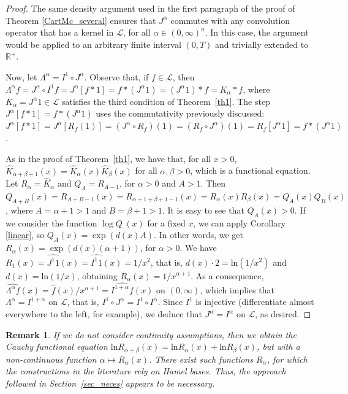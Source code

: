 \documentclass[12pt,reqno]{amsart}
\theoremstyle{plain}
\newtheorem{remark}[theorem]{Remark}
\numberwithin{equation}{section} %
\begin{document}
\begin{proof}
The same density argument used in the first paragraph of the proof of Theorem \ref{CartMc_several} ensures that $J^\alpha$ commutes with any convolution operator that has a kernel in $\mathcal{L}$, for all $\alpha\in (0,\infty)^n$. In this case, the argument would be applied to an arbitrary finite interval $(0,T)$ and trivially extended to $\mathbb{R}^+$.

Now, let $\Lambda^\alpha =I^1\circ J^\alpha$. Observe that, if $f\in\mathcal{L}$, then $\Lambda^\alpha f=J^\alpha\circ I^1 f=J^\alpha[f\ast 1]=f\ast (J^\alpha 1)=(J^\alpha 1)\ast f=K_\alpha\ast f$, where $K_\alpha=J^\alpha 1\in\mathcal{L}$ satisfies the third condition of Theorem~\ref{th1}. The step $J^\alpha[f\ast 1]=f\ast (J^\alpha 1)$ uses the commutativity previously discussed: $J^\alpha[f\ast 1]=J^\alpha[R_f(1)]=(J^\alpha\circ R_f)(1)=(R_f\circ J^\alpha)(1)=R_f[J^\alpha 1]=f\ast (J^\alpha 1)$.

As in the proof of Theorem~\ref{th1}, we have that, for all $x>0$, $\widehat{K}_{\alpha+\beta+1}(x)=\widehat{K}_\alpha(x)\widehat{K}_\beta(x)$ for all $\alpha,\beta>0$, which is a functional equation. Let $R_\alpha=\widehat{K}_\alpha$ and $Q_A=R_{A-1}$, for $\alpha>0$ and $A>1$. Then $Q_{A+B}(x)=R_{A+B-1}(x)=R_{\alpha+1+\beta+1-1}(x)=R_\alpha(x) R_\beta(x)=Q_A(x) Q_B(x)$, where $A=\alpha+1>1$ and $B=\beta+1>1$. It is easy to see that $Q_A(x)>0$. If we consider the function $\log Q_{\cdot}(x)$ for a fixed $x$, we can apply Corollary \ref{linear}, so $Q_A(x)=\exp(d(x)A)$. In other words, we get $R_\alpha(x)=\exp(d(x)(\alpha+1))$, for $\alpha>0$. We have $R_1(x)=\widehat{J^1 1}(x)=\widehat{I^1 1}(x)=1/x^2$, that is, $d(x)\cdot 2=\mathrm{ln}(1/x^2)$ and $d(x)=\mathrm{ln}(1/x)$, obtaining $R_\alpha(x)=1/x^{\alpha+1}$. As a consequence, $\widehat{\Lambda^\alpha f}(x)=\widehat{f}(x)/x^{\alpha+1}=\widehat{I^{1+\alpha} f}(x)$ on $(0,\infty)$, which implies that $\Lambda^\alpha=I^{1+\alpha}$ on $\mathcal{L}$, that is, $I^1 \circ J^\alpha=I^1\circ I^\alpha$. Since $I^1$ is injective (differentiate almost everywhere to the left, for example), we deduce that $J^\alpha=I^\alpha$ on $\mathcal{L}$, as desired.
\end{proof}

\begin{remark} \normalfont
If we do not consider continuity assumptions, then we obtain the Cauchy functional equation $\mathrm{ln}R_{\alpha+\beta}(x)=\mathrm{ln}R_\alpha(x)+\mathrm{ln}R_\beta(x)$, but with a non-continuous function $\alpha\mapsto R_\alpha(x)$. There exist such functions $R_\alpha$, for which the constructions in the literature rely on Hamel bases. Thus, the approach followed in Section~\ref{sec_neces} appears to be necessary.
\end{remark}
\end{document}
